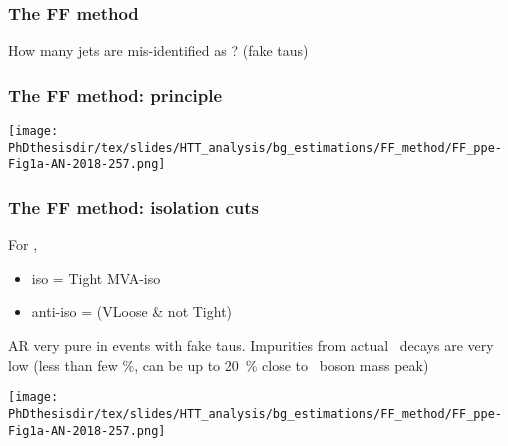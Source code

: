 \begin{frame}
\frametitle{The FF method}

\manip How many jets are mis-identified as \tauh? (fake taus)

\end{frame}

\begin{frame}
\frametitle{The FF method: principle}
\begin{center}
\texttt{[image: \\PhDthesisdir/tex/slides/HTT\_analysis/bg\_estimations/FF\_method/FF\_ppe-Fig1a-AN-2018-257.png]}
\end{center}
\end{frame}

\begin{frame}
\frametitle{The FF method: isolation cuts}

\begin{minipage}[c]{.45\textwidth}
For \tauh,
\begin{itemize}
\item iso = Tight MVA-iso
\item anti-iso = (VLoose \& not Tight)%
\end{itemize}

\manip AR very pure in events with fake taus.
\manip Impurities from actual \tauh\ decays are very low (less than few \%, can be up to \SI{20}{\%} close to \Zboson\ boson mass peak)
\end{minipage}
\hfill
\begin{minipage}[c]{.45\textwidth}
\begin{center}
\texttt{[image: \\PhDthesisdir/tex/slides/HTT\_analysis/bg\_estimations/FF\_method/FF\_ppe-Fig1a-AN-2018-257.png]}
\end{center}
\end{minipage}

\end{frame}

